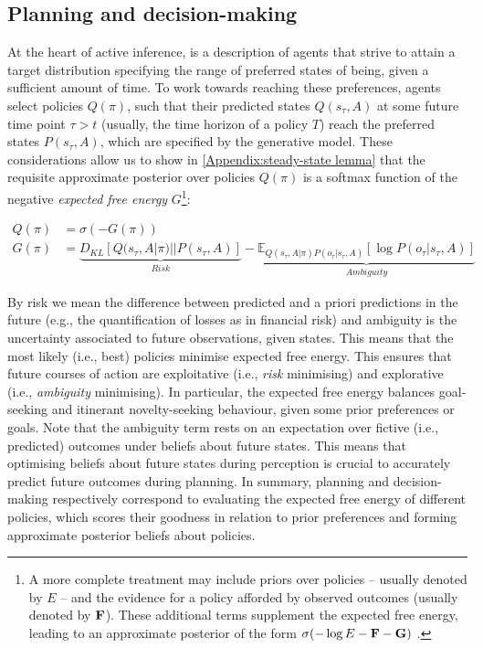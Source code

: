 \documentclass[review,12pt,authoryear]{elsarticle}
\begin{document}
\subsection{Planning and decision-making}

At the heart of active inference, is a description of agents that strive to attain a target distribution specifying the range of preferred states of being, given a sufficient amount of time. To work towards reaching these preferences, agents select policies $Q(\pi)$, such that their predicted states $Q(s_\tau,A)$ at some future time point $\tau > t$ (usually, the time horizon of a policy $T$) reach the preferred states $P(s_\tau,A)$, which are specified by the generative model. These considerations allow us to show in \ref{Appendix:steady-state lemma} that the requisite approximate posterior over policies $Q(\pi)$ is a softmax function of the negative \textit{expected free energy} $G$\footnote{A more complete treatment may include priors over policies – usually denoted by $E$ – and the evidence for a policy afforded by observed outcomes (usually denoted by $\bold F$). These additional terms supplement the expected free energy, leading to an approximate posterior of the form $\sigma (- \log E - \bold F - \bold G)$ \citep{fristonDeepTemporalModels2018}.}:

\begin{equation}
\label{eq: approx post policies}
\begin{split}
   Q(\pi) &=\sigma(-G(\pi)) \\
   G(\pi) &= \underbrace{ D_{KL}[Q(s_\tau, A|\pi)||P(s_\tau, A)]}_{Risk}- \underbrace{\mathbb E_{Q(s_\tau, A|\pi)P(o_\tau|s_\tau, A)}[ \log P(o_\tau |s_\tau, A)]}_{Ambiguity}
\end{split}
\end{equation}

By risk we mean the difference between predicted and a priori predictions in the future (e.g., the quantification of losses as in financial risk) and ambiguity is the uncertainty associated to future observations, given states. This means that the most likely (i.e., best) policies minimise expected free energy. This ensures that future courses of action are exploitative (i.e., \textit{risk} minimising) and explorative (i.e., \textit{ambiguity} minimising). In particular, the expected free energy balances goal-seeking and itinerant novelty-seeking behaviour, given some prior preferences or goals. Note that the ambiguity term rests on an expectation over fictive (i.e., predicted) outcomes under beliefs about future states. This means that optimising beliefs about future states during perception is crucial to accurately predict future outcomes during planning. In summary, planning and decision-making respectively correspond to evaluating the expected free energy of different policies, which scores their goodness in relation to prior preferences and forming approximate posterior beliefs about policies.
\end{document}
